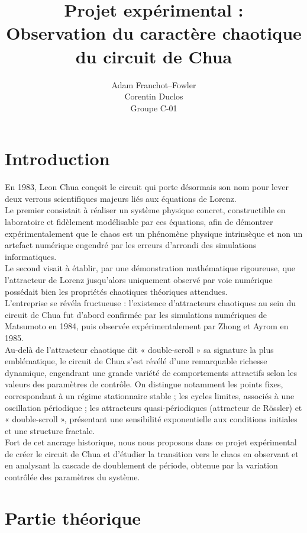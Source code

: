 \documentclass{article}
\title{Projet expérimental :\\
Observation du caractère chaotique du circuit de Chua}
\author{Adam Franchot--Fowler \\Corentin Duclos\\Groupe C-01}
\date{}
\begin{document}
\maketitle
\tableofcontents
\section{Introduction}
En 1983, Leon Chua \cite{chua2007chua} conçoit le circuit qui porte désormais son nom pour lever deux verrous scientifiques majeurs liés aux équations de Lorenz. \\

Le premier consistait à réaliser un système physique concret, constructible en laboratoire et fidèlement modélisable par ces équations, afin de démontrer expérimentalement que le chaos est un phénomène physique intrinsèque et non un artefact numérique engendré par les erreurs d'arrondi des simulations informatiques.\\ Le second visait à établir, par une démonstration mathématique rigoureuse, que l'attracteur de Lorenz jusqu'alors uniquement observé par voie numérique possédait bien les propriétés chaotiques théoriques attendues.\\

L'entreprise se révéla fructueuse : l'existence d'attracteurs chaotiques au sein du circuit de Chua fut d'abord confirmée par les simulations numériques de Matsumoto en 1984, puis observée expérimentalement par Zhong et Ayrom en 1985.\\

Au-delà de l'attracteur chaotique dit « double-scroll » sa signature la plus emblématique, le circuit de Chua s'est révélé d'une remarquable richesse dynamique, engendrant une grande variété de comportements attractifs selon les valeurs des paramètres de contrôle. On distingue notamment les points fixes, correspondant à un régime stationnaire stable ; les cycles limites, associés à une oscillation périodique ; les attracteurs quasi-périodiques (attracteur de Rössler) et « double-scroll », présentant une sensibilité exponentielle aux conditions initiales et une structure fractale.\\

Fort de cet ancrage historique, nous nous proposons dans ce projet expérimental de créer le circuit de Chua et d'étudier la transition vers le chaos en observant et en analysant la cascade de doublement de période, obtenue par la variation contrôlée des paramètres du système.

\clearpage
\section{Partie théorique}
\end{document}
